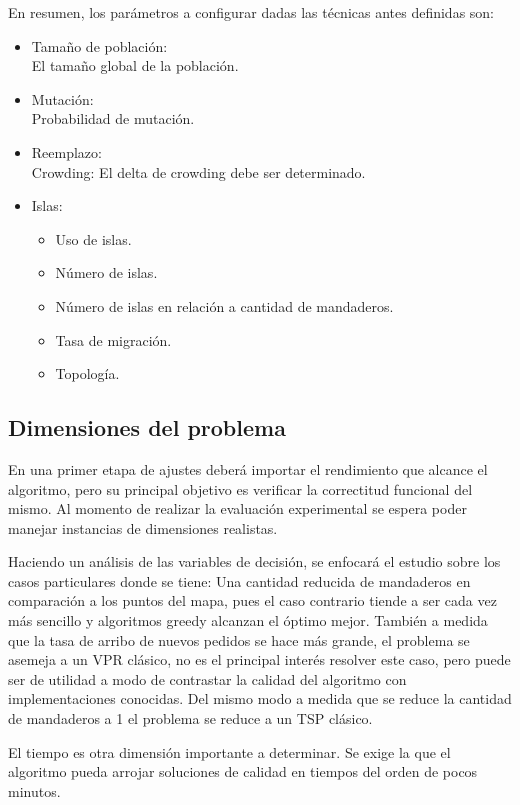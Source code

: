 \documentclass[9pt,conference]{IEEEtran}
\begin{document}
		En resumen, los parámetros a configurar dadas las técnicas antes definidas son:
		\begin{itemize}
			\item
			Tamaño de población:\\
				El tamaño global de la población.
			\item
			Mutación:\\
				Probabilidad de mutación.
			\item
			Reemplazo:\\
				Crowding: El delta de crowding debe ser determinado.
			\item
			Islas:\\
			\begin{itemize}
				\item Uso de islas.
				\item Número de islas.
				\item Número de islas en relación a cantidad de mandaderos.
				\item Tasa de migración.
				\item Topología.
			\end{itemize}
		\end{itemize}

	\subsection{Dimensiones del problema}

		En una primer etapa de ajustes deberá importar el rendimiento que alcance el algoritmo, pero su principal objetivo es verificar la correctitud funcional del mismo.
		Al momento de realizar la evaluación experimental se espera poder manejar instancias de dimensiones realistas.

		Haciendo un análisis de las variables de decisión, se enfocará el estudio sobre los casos particulares donde se tiene:
			Una cantidad reducida de mandaderos en comparación a los puntos del mapa, pues el caso contrario tiende a ser cada vez más sencillo y algoritmos greedy alcanzan el óptimo mejor.
			También a medida que la tasa de arribo de nuevos pedidos se hace más grande, el problema se asemeja a un VPR clásico, no es el principal interés resolver este caso, pero puede ser de utilidad a modo de contrastar la calidad del algoritmo con implementaciones conocidas. Del mismo modo a medida que se reduce la cantidad de mandaderos a 1 el problema se reduce a un TSP clásico.

		El tiempo es otra dimensión importante a determinar. Se exige la que el algoritmo pueda arrojar soluciones de calidad en tiempos del orden de pocos minutos.
\end{document}
